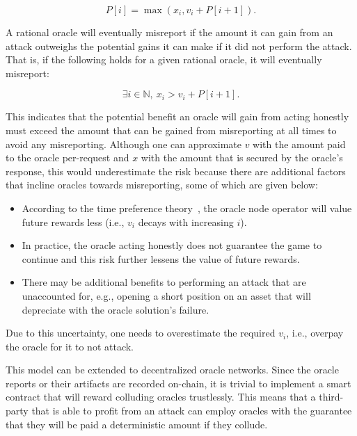 \documentclass[11pt]{article}
\begin{document}
\begin{equation}
P \left[ i \right] = \max \left( x_i, v_i + P \left[ i + 1 \right] \right).
\end{equation}

A rational oracle will eventually misreport if the amount it can gain from an attack outweighs the potential gains it can make if it did not perform the attack.
That is, if the following holds for a given rational oracle, it will eventually misreport:

\begin{equation}
\exists i \in \mathbb{N},~ x_i > v_i + P \left[ i + 1 \right].
\end{equation}

This indicates that the potential benefit an oracle will gain from acting honestly must exceed the amount that can be gained from misreporting at all times to avoid any misreporting.
Although one can approximate $v$ with the amount paid to the oracle per-request and $x$ with the amount that is secured by the oracle’s response, this would underestimate the risk because there are additional factors that incline oracles towards misreporting, some of which are given below:

\begin{itemize}
    \item According to the time preference theory~\cite{frederick:2002}, the oracle node operator will value future rewards less (i.e., $v_i$ decays with increasing $i$).
    \item In practice, the oracle acting honestly does not guarantee the game to continue and this risk further lessens the value of future rewards.
    \item There may be additional benefits to performing an attack that are unaccounted for, e.g., opening a short position on an asset that will depreciate with the oracle solution’s failure.
\end{itemize}

Due to this uncertainty, one needs to overestimate the required $v_i$, i.e., overpay the oracle for it to not attack.

This model can be extended to decentralized oracle networks.
Since the oracle reports or their artifacts are recorded on-chain, it is trivial to implement a smart contract that will reward colluding oracles trustlessly.
This means that a third-party that is able to profit from an attack can employ oracles with the guarantee that they will be paid a deterministic amount if they collude.
\end{document}
